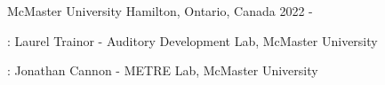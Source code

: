 

\begin{cventries}

  \cventry
    {} %
    {McMaster University} %
    {Hamilton, Ontario, Canada} %
    { 2022 - }%
    {%
      \begin{cvitems} %
        \item {}: Laurel Trainor - 
          Auditory Development Lab, McMaster University
      \item {}: Jonathan Cannon - 
          METRE Lab, McMaster University
      \end{cvitems}
    }


\end{cventries}
